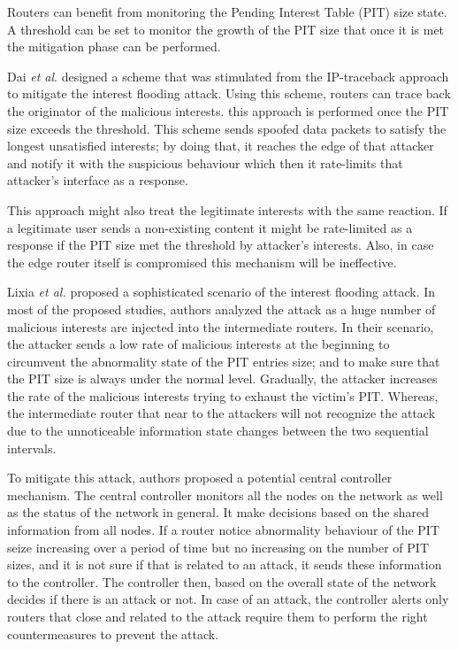\documentclass[conference]{IEEEtran}
\begin{document}
Routers can benefit from monitoring the Pending Interest Table (PIT) size state. A threshold can be set to monitor the growth of the PIT size that once it is met the mitigation phase can be performed.  

Dai \textit{et al}. \cite{Dai2013MitigateDA} designed a scheme that was stimulated from the IP-traceback approach to mitigate the interest flooding attack. Using this scheme, routers can trace back the originator of the malicious interests. this approach is performed once the PIT size exceeds the threshold. This scheme sends spoofed data packets to satisfy the longest unsatisfied interests; by doing that, it reaches the edge of that attacker and notify it with the suspicious behaviour which then it rate-limits that attacker's interface as a response.   

This approach might also treat the legitimate interests with the same reaction. If a legitimate user sends a non-existing content it might be rate-limited as a response if the PIT size met the threshold by attacker's interests. Also, in case the edge router itself is compromised this mechanism will be ineffective.     

Lixia \textit{et al.} \cite{Zhao2018} proposed a sophisticated scenario of the interest flooding attack. In most of the proposed studies, authors analyzed the attack as a huge number of malicious interests are injected into the intermediate routers. 
In their scenario, the attacker sends a low rate of malicious interests at the beginning to circumvent the abnormality state of the PIT entries size; and to make sure that the PIT size is always under the normal level. Gradually, the attacker increases the rate of the malicious interests trying to exhaust the victim's PIT. Whereas, the intermediate router that near to the attackers will not recognize the attack due to the unnoticeable information state changes between the two sequential intervals.

To mitigate this attack, authors proposed a potential central controller mechanism. The central controller monitors all the nodes on the network as well as the status of the network in general. It make decisions based on the shared information from all nodes. If a router notice abnormality behaviour of the PIT seize increasing over a period of time but no increasing on the number of PIT sizes, and it is not sure if that is related to an attack, it sends these information to the controller. The controller then, based on the overall state of the network decides if there is an attack or not. In case of an attack, the controller alerts only routers that close and related to the attack require them to perform the right countermeasures to prevent the attack. 
   
\end{document}
